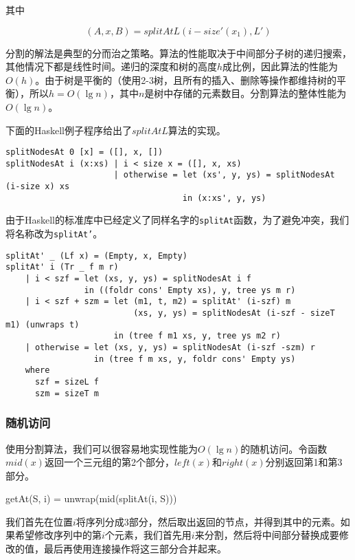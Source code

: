 \documentclass[UTF8]{article}
\begin{document}
其中

\[
(A, x, B) = splitAtL(i-size'(x_1), L')
\]

分割的解法是典型的分而治之策略。算法的性能取决于中间部分子树的递归搜索，其他情况下都是线性时间。递归的深度和树的高度$h$成比例，因此算法的性能为$O(h)$。由于树是平衡的（使用2-3树，且所有的插入、删除等操作都维持树的平衡），所以$h = O(\lg n)$，其中$n$是树中存储的元素数目。分割算法的整体性能为$O(\lg n)$。

下面的Haskell例子程序给出了$splitAtL$算法的实现。

\lstset{language=Haskell}
\begin{lstlisting}[style=Haskell]
splitNodesAt 0 [x] = ([], x, [])
splitNodesAt i (x:xs) | i < size x = ([], x, xs)
                      | otherwise = let (xs', y, ys) = splitNodesAt (i-size x) xs
                                    in (x:xs', y, ys)
\end{lstlisting}

由于Haskell的标准库中已经定义了同样名字的\texttt{splitAt}函数，为了避免冲突，我们将名称改为\texttt{splitAt'}。

\begin{lstlisting}[style=Haskell]
splitAt' _ (Lf x) = (Empty, x, Empty)
splitAt' i (Tr _ f m r)
    | i < szf = let (xs, y, ys) = splitNodesAt i f
                in ((foldr cons' Empty xs), y, tree ys m r)
    | i < szf + szm = let (m1, t, m2) = splitAt' (i-szf) m
                          (xs, y, ys) = splitNodesAt (i-szf - sizeT m1) (unwraps t)
                      in (tree f m1 xs, y, tree ys m2 r)
    | otherwise = let (xs, y, ys) = splitNodesAt (i-szf -szm) r
                  in (tree f m xs, y, foldr cons' Empty ys)
    where
      szf = sizeL f
      szm = sizeT m
\end{lstlisting}

\subsubsection{随机访问}

使用分割算法，我们可以很容易地实现性能为$O(\lg n)$的随机访问。令函数$mid(x)$返回一个三元组的第2个部分，$left(x)$和$right(x)$分别返回第1和第3部分。

\be
getAt(S, i) = unwrap(mid(splitAt(i, S)))
\ee

我们首先在位置$i$将序列分成3部分，然后取出返回的节点，并得到其中的元素。如果希望修改序列中的第$i$个元素，我们首先用$i$来分割，然后将中间部分替换成要修改的值，最后再使用连接操作将这三部分合并起来。
\end{document}
